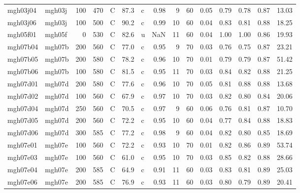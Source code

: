 \documentclass{article}
\begin{document}
\begin{landscape}
\begin{longtable}{llrrlrlrrrrrrrr}
    mgh03j04 &     mgh03j &  100 &  470 &     C &    87.3 &   c &  0.98 &   9 &         60 &  0.05 &  0.79 &  0.78 &  0.87 &   13.03 \\
    mgh03j06 &     mgh03j &  100 &  500 &     C &    90.2 &   c &  0.99 &  10 &         60 &  0.04 &  0.83 &  0.81 &  0.88 &   18.25 \\
    mgh05f01 &     mgh05f &    0 &  530 &     C &    82.6 &   u &   NaN &  11 &         60 &  0.04 &  1.00 &  1.00 &  0.86 &   19.93 \\
    mgh07b04 &     mgh07b &  200 &  560 &     C &    77.0 &   c &  0.95 &   9 &         70 &  0.03 &  0.76 &  0.75 &  0.87 &   23.21 \\
    mgh07b05 &     mgh07b &  200 &  580 &     C &    78.2 &   c &  0.96 &  10 &         70 &  0.01 &  0.79 &  0.79 &  0.87 &   51.42 \\
    mgh07b06 &     mgh07b &  100 &  580 &     C &    81.5 &   c &  0.95 &  11 &         70 &  0.03 &  0.84 &  0.82 &  0.88 &   21.25 \\
    mgh07d01 &     mgh07d &  200 &  580 &     C &    77.6 &   c &  0.96 &  10 &         70 &  0.05 &  0.81 &  0.88 &  0.88 &   13.68 \\
    mgh07d02 &     mgh07d &  100 &  560 &     C &    67.9 &   c &  0.97 &  10 &         70 &  0.03 &  0.82 &  0.80 &  0.84 &   20.06 \\
    mgh07d04 &     mgh07d &  250 &  560 &     C &    70.5 &   c &  0.97 &   9 &         60 &  0.06 &  0.76 &  0.81 &  0.87 &   10.70 \\
    mgh07d05 &     mgh07d &  200 &  560 &     C &    72.2 &   c &  0.95 &  10 &         60 &  0.04 &  0.77 &  0.84 &  0.88 &   18.83 \\
    mgh07d06 &     mgh07d &  300 &  585 &     C &    77.2 &   c &  0.98 &   9 &         60 &  0.04 &  0.82 &  0.80 &  0.85 &   18.69 \\
    mgh07e01 &     mgh07e &  100 &  560 &     C &    72.2 &   c &  0.93 &  10 &         70 &  0.01 &  0.82 &  0.86 &  0.89 &   53.74 \\
    mgh07e03 &     mgh07e &  100 &  560 &     C &    61.0 &   c &  0.95 &  10 &         70 &  0.03 &  0.85 &  0.82 &  0.88 &   28.66 \\
    mgh07e04 &     mgh07e &  200 &  585 &     C &    64.9 &   c &  0.91 &  11 &         60 &  0.03 &  0.83 &  0.81 &  0.89 &   25.03 \\
    mgh07e06 &     mgh07e &  200 &  585 &     C &    76.9 &   c &  0.93 &  11 &         60 &  0.03 &  0.80 &  0.79 &  0.89 &   20.41 \\

\end{longtable}
\end{landscape}
\end{document}
